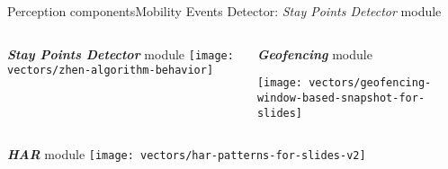 \begin{frame}{Perception components}{Mobility Events Detector: \emph{Stay Points Detector} module}
\small
\vspace{-0.3cm}
\begin{columns}
\begin{column}[T]{0.5\textwidth}
\begin{block}{\small \emph{\textbf{Stay Points Detector}} module}
{
  \centering
  \texttt{[image: vectors/zhen-algorithm-behavior]}
}
\end{block}
\end{column}

\begin{column}[T]{0.5\textwidth}
\begin{block}{\small \emph{\textbf{Geofencing}} module}

{
  \centering
  \texttt{[image: vectors/geofencing-window-based-snapshot-for-slides]}
}
\end{block}
\end{column}
\end{columns}

\begin{block}{\small \emph{\textbf{HAR}} module}
{
  \centering
  \texttt{[image: vectors/har-patterns-for-slides-v2]}
}
\end{block}


\end{frame}

